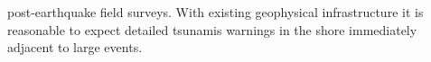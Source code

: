 post-earthquake field surveys. With existing geophysical infrastructure it is reasonable to expect detailed tsunamis warnings in the shore immediately adjacent to large events.



